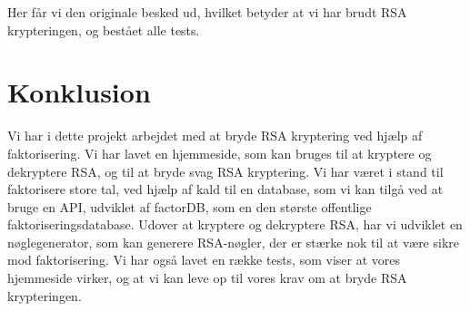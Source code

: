 \documentclass[a4paper,12pt]{extarticle}
\begin{document}
    Her får vi den originale besked ud, hvilket betyder at vi har brudt RSA krypteringen, og bestået alle tests.


    \section{Konklusion}\label{sec:konklusion}
    Vi har i dette projekt arbejdet med at bryde RSA kryptering ved hjælp af faktorisering.
    Vi har lavet en hjemmeside, som kan bruges til at kryptere og dekryptere RSA, og til at bryde svag RSA kryptering.
    Vi har været i stand til faktorisere store tal, ved hjælp af kald til en database,
    som vi kan tilgå ved at bruge en API, udviklet af factorDB, som en den største offentlige faktoriseringsdatabase.
    Udover at kryptere og dekryptere RSA, har vi udviklet en nøglegenerator, som kan generere RSA-nøgler,
    der er stærke nok til at være sikre mod faktorisering.
    Vi har også lavet en række tests, som viser at vores hjemmeside virker,
    og at vi kan leve op til vores krav om at bryde RSA krypteringen.
\end{document}
